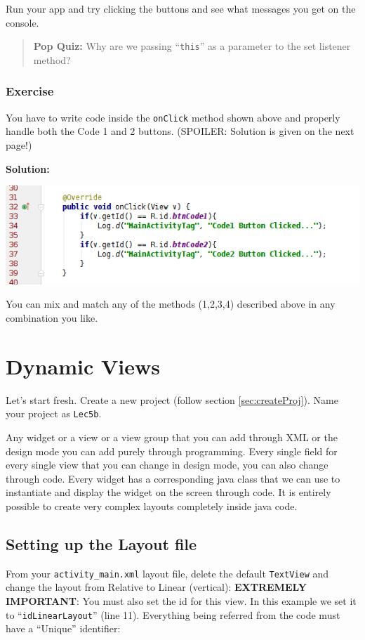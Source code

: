 Run your app and try clicking the buttons and see what messages you get on the console.

\begin{quote}
	\textbf{Pop Quiz:} Why are we passing ``\texttt{this}'' as a parameter to the set listener method?
\end{quote}

\subsubsection{Exercise}

You have to write code inside the \texttt{onClick} method shown above and properly handle both the Code 1 and 2 buttons. (SPOILER: Solution is given on the next page!)

\newpage

\textbf{Solution:}
\begin{center}
	\includegraphics[scale=0.4]{chapters/ch05/images/15}
\end{center}

\vskip 3mm
You can mix and match any of the methods (1,2,3,4) described above in any combination you like.

\section{Dynamic Views}
Let's start fresh. Create a new project (follow section \ref{sec:createProj}). Name your project as \texttt{Lec5b}.

Any widget or a view or a view group that you can add through XML or the design mode you can add purely through programming. Every single field for every single view that you can change in design mode, you can also change through code. Every widget has a corresponding java class that we can use to instantiate and display the widget on the screen through code. It is entirely possible to create very complex layouts completely inside java code. \\

\subsection{Setting up the Layout file}
From your \texttt{activity\_main.xml} layout file, delete the default \texttt{TextView} and change the layout from Relative to Linear (vertical): \textbf{EXTREMELY IMPORTANT}: You must also set the id for this view. In this example we set it to ``\texttt{idLinearLayout}'' (line 11). Everything being referred from the code must have a ``Unique'' identifier:

